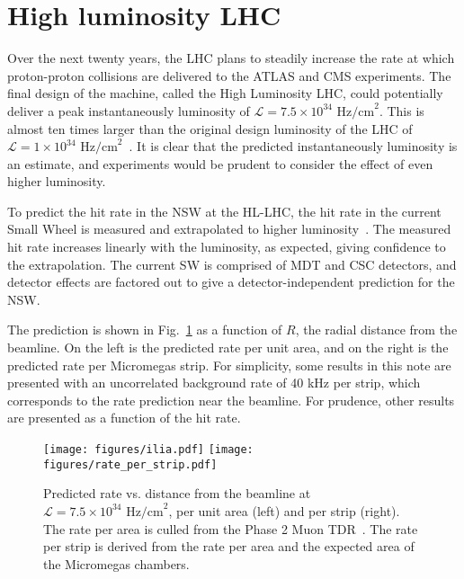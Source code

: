 \section{High luminosity LHC}
\label{sec:hllhc}

Over the next twenty years, the LHC plans to steadily increase the rate at which proton-proton collisions are delivered to the ATLAS and CMS experiments. The final design of the machine, called the High Luminosity LHC, could potentially deliver a peak instantaneously luminosity of $\mathcal{L} = 7.5\times10^{34}\text{ Hz/cm}^2$. This is almost ten times larger than the original design luminosity of the LHC of $\mathcal{L} = 1\times10^{34}\text{ Hz/cm}^2$~\cite{lhc}. It is clear that the predicted instantaneously luminosity is an estimate, and experiments would be prudent to consider the effect of even higher luminosity.

To predict the hit rate in the NSW at the HL-LHC, the hit rate in the current Small Wheel is measured and extrapolated to higher luminosity~\cite{tuna,phase2}. The measured hit rate increases linearly with the luminosity, as expected, giving confidence to the extrapolation. The current SW is comprised of MDT and CSC detectors, and detector effects are factored out to give a detector-independent prediction for the NSW.

The prediction is shown in Fig.~\ref{fig:rate_vs_r} as a function of $R$, the radial distance from the beamline. On the left is the predicted rate per unit area, and on the right is the predicted rate per Micromegas strip. For simplicity, some results in this note are presented with an uncorrelated background rate of 40 kHz per strip, which corresponds to the rate prediction near the beamline. For prudence, other results are presented as a function of the hit rate.
\begin{figure}[!htpb]
  \begin{center}
    \texttt{[image: figures/ilia.pdf]}
    \texttt{[image: figures/rate\_per\_strip.pdf]}
  \end{center}
  \vspace{-10pt}
  \caption{Predicted rate vs. distance from the beamline at $\mathcal{L} = 7.5\times10^{34}\text{ Hz/cm}^2$, per unit area (left) and per strip (right). The rate per area is culled from the Phase 2 Muon TDR~\cite{phase2}. The rate per strip is derived from the rate per area and the expected area of the Micromegas chambers.}
  \label{fig:rate_vs_r}
\end{figure}

